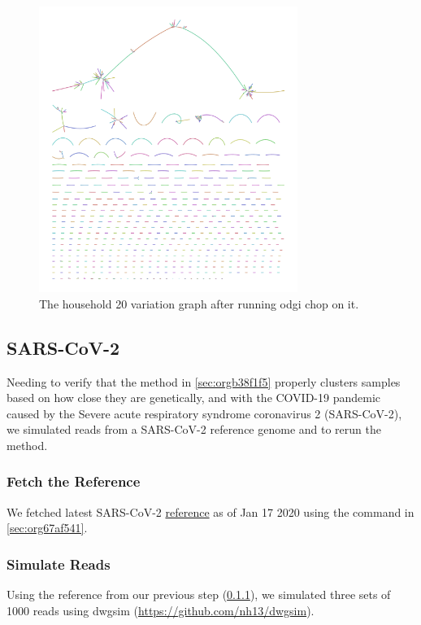 \documentclass[10pt, a4paper]{article}
\begin{document}
\begin{figure}[h!]
\centering
\includegraphics[width=0.75\textwidth]{../Figures/RSV/Assembly_Bluntified.png}
\caption[RSV Variation Graph]{\label{fig:orgdab1b12}
The household 20 variation graph after running odgi chop on it.}
\end{figure}

\clearpage
\subsection{SARS-CoV-2}
\label{sec:org91e7a90}
Needing to verify that the method in \ref{sec:orgb38f1f5} properly clusters samples based on 
how close they are genetically, and with the COVID-19 pandemic caused by the 
Severe acute respiratory syndrome coronavirus 2 (SARS-CoV-2), we simulated 
reads from a SARS-CoV-2 reference genome and to rerun the method.

\subsubsection{Fetch the Reference}
\label{sec:orgfe21bd2}
We fetched latest SARS-CoV-2 \href{https://www.ncbi.nlm.nih.gov/nuccore/1798174254}{reference} as of Jan 17 2020 using the command in
\ref{sec:org67af541}.

\subsubsection{Simulate Reads}
\label{sec:org3af0b24}
Using the reference from our previous step (\ref{sec:orgfe21bd2}), we simulated 
three sets of 1000 reads using dwgsim (\url{https://github.com/nh13/dwgsim}).
\end{document}
